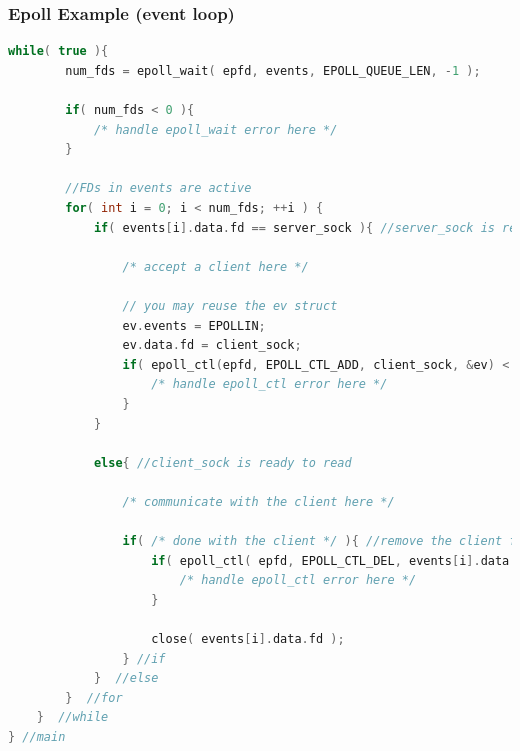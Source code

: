 \documentclass[aspectratio=43]{beamer}
\begin{document}
\begin{frame}[fragile]
  \frametitle{Epoll Example (event loop)}
\begin{lstlisting}[language=C++,basicstyle=\ttfamily\tiny,commentstyle=\color{commgreen},keywordstyle=\color{blue},breaklines=true]
    while( true ){  
        num_fds = epoll_wait( epfd, events, EPOLL_QUEUE_LEN, -1 );

        if( num_fds < 0 ){
            /* handle epoll_wait error here */
        }
    
        //FDs in events are active
        for( int i = 0; i < num_fds; ++i ) {
            if( events[i].data.fd == server_sock ){ //server_sock is ready to accept
                
                /* accept a client here */
                
                // you may reuse the ev struct
                ev.events = EPOLLIN;
                ev.data.fd = client_sock;
                if( epoll_ctl(epfd, EPOLL_CTL_ADD, client_sock, &ev) < 0 ){
                    /* handle epoll_ctl error here */
                } 
            }

            else{ //client_sock is ready to read
                
                /* communicate with the client here */
                
                if( /* done with the client */ ){ //remove the client from epoll queue               
                    if( epoll_ctl( epfd, EPOLL_CTL_DEL, events[i].data.fd, NULL ) < 0 ){
                        /* handle epoll_ctl error here */
                    }
                    
                    close( events[i].data.fd );
                } //if
            }  //else
        }  //for
    }  //while
} //main
   \end{lstlisting}
\end{frame}
\end{document}
